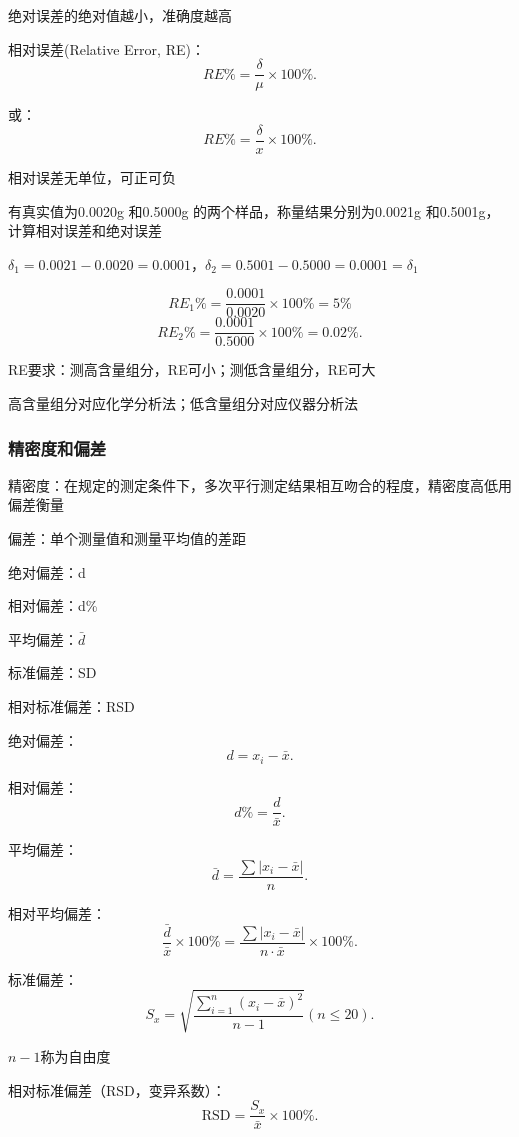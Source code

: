 绝对误差的绝对值越小，准确度越高

相对误差(Relative Error, RE)：\[
    RE\% = \frac{\delta}{\mu}\times 100\%
.\] 

或：\[
    RE\% = \frac{\delta}{x}\times 100\%
.\]

相对误差无单位，可正可负
\begin{eg}
    有真实值为0.0020g 和0.5000g 的两个样品，称量结果分别为0.0021g 和0.5001g，计算相对误差和绝对误差

$\delta_1=0.0021-0.0020=0.0001$，$\delta_2=0.5001-0.5000=0.0001=\delta_1$

\[
    RE_1\%=\frac{0.0001}{0.0020}\times 100\%=5\%
\]
\[
    RE_2\%=\frac{0.0001}{0.5000}\times 100\%=0.02\%
.\]  

\begin{notation}
    RE要求：测高含量组分，RE可小；测低含量组分，RE可大

    高含量组分对应化学分析法；低含量组分对应仪器分析法
\end{notation}
\subsubsection{精密度和偏差}%
\label{subsub:精密度和偏差}
\begin{defi}
    精密度：在规定的测定条件下，多次平行测定结果相互吻合的程度，精密度高低用偏差衡量

    偏差：单个测量值和测量平均值的差距
\end{defi}
\begin{defi}
    绝对偏差：d

    相对偏差：d\%

    平均偏差：$\bar{d}$

    标准偏差：SD

    相对标准偏差：RSD
\end{defi}

绝对偏差：\[
    d=x_i-\bar{x}
.\]

相对偏差：\[
    d\%=\frac{d}{\bar{x}}
.\]

平均偏差：\[
    \bar{d}=\frac{\sum |x_{i}-\bar{x}|}{n}
.\]

相对平均偏差：\[
    \frac{\bar{d}}{\bar{x}}\times 100\%=\frac{\sum |x_{i}-\bar{x}|}{n\cdot \bar{x}}\times 100\%
.\]

标准偏差：\[
    S_x=\sqrt{\frac{\displaystyle{\sum_{i=1}^{n} \left( x_{i}-\bar{x} \right) ^2}}{n-1}} \left(n\le 20  \right) 
.\] 

$n-1 $称为自由度

相对标准偏差（RSD，变异系数）：\[
    \text{RSD}=\frac{S_x}{\bar{x}}\times 100\%
.\] 


\end{eg}
